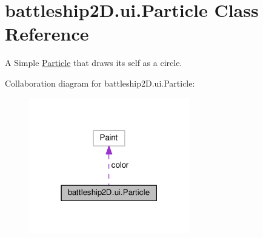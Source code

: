 \hypertarget{classbattleship2D_1_1ui_1_1Particle}{\section{battleship2\-D.\-ui.\-Particle Class Reference}
\label{classbattleship2D_1_1ui_1_1Particle}
}


A Simple \hyperlink{classbattleship2D_1_1ui_1_1Particle}{Particle} that draws its self as a circle.  




Collaboration diagram for battleship2\-D.\-ui.\-Particle\-:\nopagebreak
\begin{figure}[H]
\begin{center}
\leavevmode
\includegraphics[width=198pt]{classbattleship2D_1_1ui_1_1Particle__coll__graph}
\end{center}
\end{figure}
